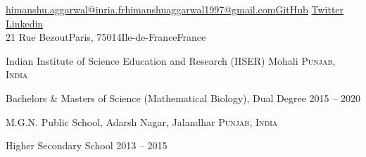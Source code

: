 \documentclass[11pt,a4paper]{article} %
\begin{document}
 



\noindent\href{mailto:himanshu.aggarwal@inria.fr}{himanshu.aggarwal@inria.fr}\bull \href{mailto:himanshuaggarwal1997@gmail.com}{himanshuaggarwal1997@gmail.com}\bull \href{https://github.com/man-shu}{GitHub}\bull 
\href{https://twitter.com/man_shuuu}{Twitter} \bull \href{https://www.linkedin.com/in/himanshu-aggarwal-7160961b6}{Linkedin}\\ 
21 Rue Bezout\bull Paris, 75014\bull Ile-de-France\bull France 


\spacedhrule{0.5em}{-0.4em} %



\headedsection %
{Indian Institute of Science Education and Research (IISER) Mohali}
{\textsc{Punjab, India}} {

\headedsubsection %
{Bachelors \& Masters of Science (Mathematical Biology), Dual Degree}
{2015 -- 2020}
{}
}

\headedsection %
{M.G.N. Public School, Adarsh Nagar, Jalandhar}
{\textsc{Punjab, India}} {

\headedsubsection %
{Higher Secondary School}
{2013 -- 2015} {}
}
\end{document}
